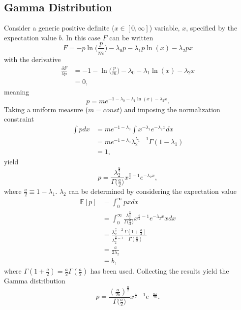 \documentclass[fleqn,usenatbib,nofootinbib]{revtex4-2}
\begin{document}
\begin{appendices}
		\subsection{Gamma Distribution}
		\label{app:gamma}
		Consider a generic positive definite ($x\in [0,\infty]$) variable, $x$, specified by the expectation value $b$. In this case $F$ can be written
		\begin{equation}
			F = -p\ln\bigg(\frac{p}{m}\bigg)-\lambda_0p-\lambda_1p\ln(x)-\lambda_2px
		\end{equation}
		with the derivative
		\begin{equation}
			\begin{split}
				\frac{\partial F}{\partial p} &= -1-\ln\bigg(\frac{p}{m}\bigg)-\lambda_0-\lambda_1\ln(x)-\lambda_2x\\
				&=0,
			\end{split}
		\end{equation}
		meaning
		\begin{equation}
			p=me^{-1-\lambda_0-\lambda_1\ln(x)-\lambda_2x}.
		\end{equation}
		Taking a uniform measure ($m= const$) and imposing the normalization constraint
		\begin{equation}
			\begin{split}
				\int p dx &= me^{-1-\lambda_0}\int x^{-\lambda_1}e^{-\lambda_2x}dx\\
				&= me^{-1-\lambda_0}\lambda_2^{\lambda_1-1}\Gamma(1-\lambda_1)\\
				&=1,
			\end{split}
		\end{equation}
		yield
		\begin{equation}
			p=\frac{\lambda_2^{\frac{a}{2}}}{\Gamma\big(\frac{a}{2}\big)}x^{\frac{a}{2}-1}e^{-\lambda_2x},
		\end{equation}
		where $\frac{a}{2} \equiv 1-\lambda_1$. $\lambda_2$ can be determined by considering the expectation value
		\begin{equation}
			\begin{split}
				\mathbb{E}[p]&=\int_{0}^{\infty}p xdx\\
				&=\int_{0}^{\infty}\frac{\lambda_2^{\frac{a}{2}}}{\Gamma\big(\frac{a}{2}\big)}x^{\frac{a}{2}-1}e^{-\lambda_2x} xdx\\
				&=\frac{\lambda_2^{\frac{a}{2}-2}}{\lambda_2^{\frac{a}{2}-1}}\frac{\Gamma(1+\frac{a}{2})}{\Gamma(\frac{a}{2})}\\
				&=\frac{a}{2\lambda_2}\\
				&\equiv b,
			\end{split}
		\end{equation}
		where $\Gamma(1+\frac{a}{2})=\frac{a}{2}\Gamma(\frac{a}{2})$ has been used. Collecting the results yield the Gamma distribution
		\begin{equation}
			p = \frac{(\frac{a}{2b})^{\frac{a}{2}}}{\Gamma\big(\frac{a}{2}\big)}x^{\frac{a}{2}-1}e^{-\frac{ax}{2b}}.
		\end{equation}
		

\end{appendices}
\end{document}
